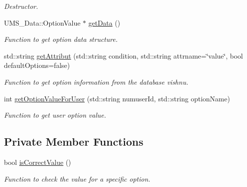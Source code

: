 \begin{DoxyCompactItemize}
\begin{DoxyCompactList}\small\item\em Destructor. \item\end{DoxyCompactList}\item 
UMS\_\-Data::OptionValue $\ast$ \hyperlink{classOptionValueServer_a9d40a465b4c6c048d49dd121cbbcb4c4}{getData} ()
\begin{DoxyCompactList}\small\item\em Function to get option data structure. \item\end{DoxyCompactList}\item 
std::string \hyperlink{classOptionValueServer_a9be8cdef4ed59ef0fdf421bb973257d0}{getAttribut} (std::string condition, std::string attrname=\char`\"{}value\char`\"{}, bool defaultOptions=false)
\begin{DoxyCompactList}\small\item\em Function to get option information from the database vishnu. \item\end{DoxyCompactList}\item 
int \hyperlink{classOptionValueServer_a849d033e5fd6ec57b8e9afb1fdd75986}{getOptionValueForUser} (std::string numuserId, std::string optionName)
\begin{DoxyCompactList}\small\item\em Function to get user option value. \item\end{DoxyCompactList}\end{DoxyCompactItemize}
\subsection*{Private Member Functions}
\begin{DoxyCompactItemize}
\item 
bool \hyperlink{classOptionValueServer_aa9d00391ec222d6f200c7ea1db8a4892}{isCorrectValue} ()
\begin{DoxyCompactList}\small\item\em Function to check the value for a specific option. \item\end{DoxyCompactList}\end{DoxyCompactItemize}
